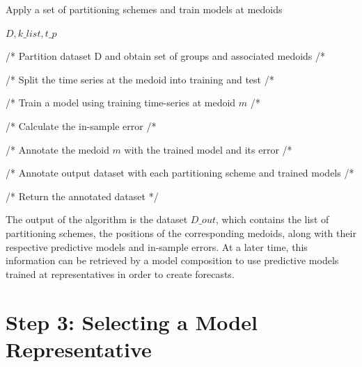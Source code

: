 \begin{algorithm}[h!]
\caption{Apply a set of partitioning schemes and train models at medoids}\label{alg:trainModelsAtMedoids}
\begin{algorithmic}[1] 
 {$D,k\_list,t\_p$}

 

   /* Partition dataset D and obtain set of groups and associated medoids  /*
 
 
  /* Split the time series at the medoid into training and test /*
 
  /* Train a model using training time-series at medoid $m$ /*
  
  /* Calculate the in-sample error /*
 
  /* Annotate the medoid $m$ with the trained model and its error /*
 \EndFor
 
 /* Annotate output dataset with each partitioning scheme and trained models /*
 
\EndFor

/* Return the annotated dataset */
\EndFunction 
\end{algorithmic} 
\end{algorithm} 

The output of the algorithm is the dataset $D\_out$, which contains the list of partitioning schemes, the positions of the corresponding medoids, along with their respective predictive models and in-sample errors. At a later time, this information can be retrieved by a model composition to use predictive models trained at representatives in order to create forecasts.

\section{Step 3: Selecting a Model Representative}
\label{Sec:KnowledgExtraction}

